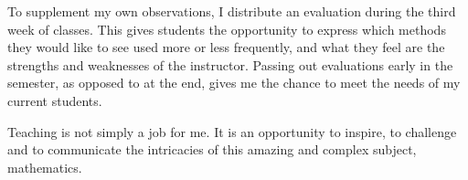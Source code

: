 \documentclass[12pt]{article}
\begin{document}
\quad To
supplement my own observations, I distribute an evaluation during the third
week of classes.  This gives students the opportunity to express which
methods they would like to see used more or less frequently, and what they
feel are the strengths and weaknesses of the instructor.  Passing out
evaluations early in the semester, as opposed to at
the end, gives me the chance to meet the needs of my current students.  

\quad Teaching is not simply a job for me.  It is an opportunity to inspire,
to challenge and to communicate the intricacies of this amazing and complex
subject, mathematics.
\end{document}
